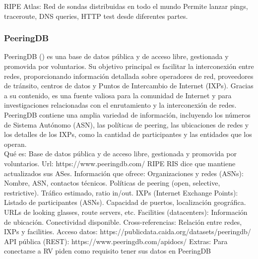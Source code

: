 RIPE Atlas:
Red de sondas distribuidas en todo el mundo 
Permite lanzar pings, traceroute, DNS queries, HTTP test desde diferentes partes.





\subsubsection{PeeringDB} \label{sec:anexo_the_peeringDB}


PeeringDB (\cite{PeeringDB}) es una base de datos pública y de acceso libre, gestionada y promovida por voluntarios. Su objetivo principal es facilitar la interconexión entre redes, proporcionando información detallada sobre operadores de red, proveedores de tránsito, centros de datos y Puntos de Intercambio de Internet (IXPs). Gracias a su contenido, es una fuente valiosa para la comunidad de Internet y para investigaciones relacionadas con el enrutamiento y la interconexión de redes. \\

PeeringDB contiene una amplia variedad de información, incluyendo los números de Sistema Autónomo (ASN), las políticas de peering, las ubicaciones de redes y los detalles de los IXPs, como la cantidad de participantes y las entidades que los operan. \\


Qué es: Base de datos pública y de acceso libre, gestionada y promovida por voluntarios.
Url: https://www.peeringdb.com/
RIPE RIS dice que mantiene actualizados sus ASes.
Información que ofrece:
Organizaciones y redes (ASNs):
Nombre, ASN, contactos técnicos.
Políticas de peering (open, selective, restrictive).
Tráfico estimado, ratio in/out.
IXPs (Internet Exchange Points):
Listado de participantes (ASNs).
Capacidad de puertos, localización geográfica.
URLs de looking glasses, route servers, etc.
Facilities (datacenters):
Información de ubicación.
Conectividad disponible.
Cross-referencias:
Relación entre redes, IXPs y facilities.
Acceso datos: https://publicdata.caida.org/datasets/peeringdb/
API pública (REST): https://www.peeringdb.com/apidocs/
Extras:
Para conectarse a RV piden como requisito tener sus datos en PeeringDB




